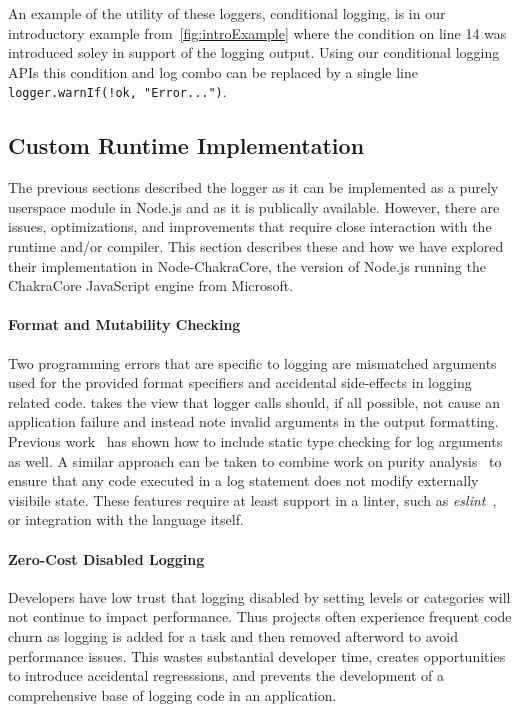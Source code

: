 An example of the utility of these loggers, conditional logging, is in our introductory 
example from~\autoref{fig:introExample} where the condition on line 14 was introduced 
soley in support of the logging output. Using our conditional logging APIs this condition 
and log combo can be replaced by a single line \lstinline{logger.warnIf(!ok, "Error...")}.

\subsection{Custom Runtime Implementation}
\label{sec:runtimesupport}
The previous sections described the \projn logger as it can be implemented as a purely 
userspace module in Node.js and as it is publically available. However, there are 
issues, optimizations, and improvements that require close interaction with the 
runtime and/or compiler. This section describes these and how we have explored their 
implementation in Node-ChakraCore, the version of Node.js running the ChakraCore 
JavaScript engine from Microsoft. 

\paragraph{Format and Mutability Checking}
\noindent
Two programming errors that are specific to logging are mismatched arguments used 
for the provided format specifiers and accidental side-effects in logging related 
code. \projn takes the view that logger calls should, if all possible, not cause 
an application failure and instead note invalid arguments in the output formatting. 
Previous work~\cite{tyepcheckprintf} has shown how to include static type 
checking for log arguments as well. A similar approach can be taken to combine 
work on purity analysis~\cite{purity1,purity2} to ensure that any code executed 
in a log statement does not modify externally visibile state. These features require 
at least support in a linter, such as \emph{eslint}~\cite{eslint}, or integration 
with the language itself.

\paragraph{Zero-Cost Disabled Logging}
\noindent
Developers have low trust that logging disabled by setting levels or categories 
will not continue to impact performance. Thus projects often experience frequent 
code churn as logging is added for a task and then removed afterword to avoid 
performance issues. This wastes substantial developer time, creates opportunities 
to introduce accidental regresssions, and prevents the development of a comprehensive 
base of logging code in an application. 


